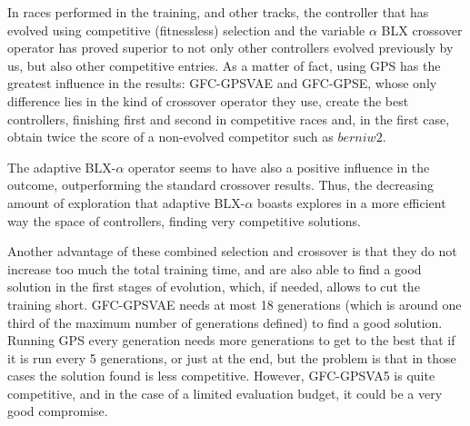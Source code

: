 \documentclass[10pt,journal,compsoc]{IEEEtran}
\begin{document}

In races performed in the training, and other tracks, the controller
that has evolved using competitive (fitnessless) selection and the
variable $\alpha$ BLX crossover operator has proved superior to not
only other controllers evolved previously by us, but also other
competitive entries. As a matter of fact, using GPS has the greatest 
influence in the results: {\sf GFC-GPSVAE} and {\sf GFC-GPSE}, whose only
difference lies in the kind of crossover operator they use, create the
best controllers, finishing first and second in competitive races and,
in the first case, obtain twice the score of a non-evolved
competitor such as $berniw2$. %


The adaptive BLX-$\alpha$ operator seems to have also a positive
influence in the outcome, outperforming the standard crossover
results. Thus, the decreasing amount of exploration that adaptive
BLX-$\alpha$ boasts explores in a more efficient way the space of
controllers, finding very competitive solutions. 

Another advantage of these combined selection and crossover is that they do not
increase too much the total training time, and are also able to find a good solution in the first stages of evolution, which, if needed, allows to cut the training short. {\sf GFC-GPSVAE} needs at most 18 generations (which is around one third of the maximum number of generations defined) to find a good solution. Running GPS every generation needs more generations to get to the best that if it is run every 5 generations, or just at the end, but the problem is that in those cases the solution found is less competitive. However, {\sf GFC-GPSVA5} is quite competitive, and in the case of a limited evaluation budget, it could be a very good compromise.
\end{document}
